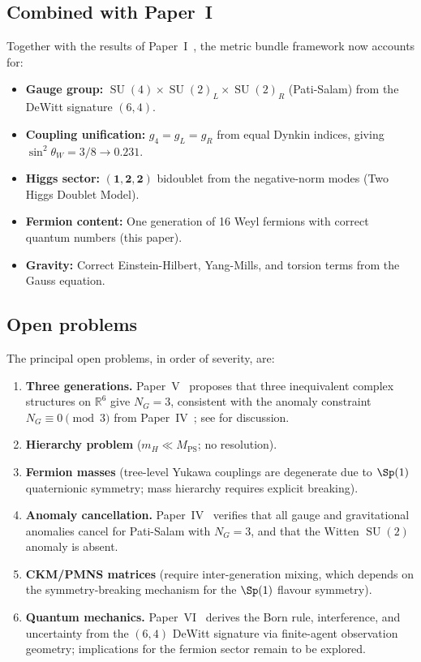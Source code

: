 \documentclass[12pt,a4paper]{article}
\theoremstyle{definition}
\newcommand{\SU}{\operatorname{SU}}
\newcommand{\R}{\mathbb{R}}
\begin{document}
\subsection{Combined with Paper~I}

Together with the results of Paper~I~\cite{Paper1}, the metric bundle framework now accounts for:
\begin{itemize}[nosep]
\item \textbf{Gauge group:} $\SU(4) \times \SU(2)_L \times \SU(2)_R$ (Pati-Salam) from the DeWitt signature $(6,4)$.
\item \textbf{Coupling unification:} $g_4 = g_L = g_R$ from equal Dynkin indices, giving $\sin^2\theta_W = 3/8 \to 0.231$.
\item \textbf{Higgs sector:} $(\mathbf{1}, \mathbf{2}, \mathbf{2})$ bidoublet from the negative-norm modes (Two Higgs Doublet Model).
\item \textbf{Fermion content:} One generation of 16 Weyl fermions with correct quantum numbers (this paper).
\item \textbf{Gravity:} Correct Einstein-Hilbert, Yang-Mills, and torsion terms from the Gauss equation.
\end{itemize}

\subsection{Open problems}

The principal open problems, in order of severity, are:
\begin{enumerate}
\item \textbf{Three generations.} Paper~V~\cite{Paper5} proposes that three inequivalent complex structures on $\R^6$ give $N_G = 3$, consistent with the anomaly constraint $N_G \equiv 0\pmod{3}$ from Paper~IV~\cite{Paper4}; see  for discussion.
\item \textbf{Hierarchy problem} ($m_H \ll M_{\mathrm{PS}}$; no resolution).
\item \textbf{Fermion masses} (tree-level Yukawa couplings are degenerate due to $\Sp(1)$ quaternionic symmetry; mass hierarchy requires explicit breaking).
\item \textbf{Anomaly cancellation.} Paper~IV~\cite{Paper4} verifies that all gauge and gravitational anomalies cancel for Pati-Salam with $N_G = 3$, and that the Witten $\SU(2)$ anomaly is absent.
\item \textbf{CKM/PMNS matrices} (require inter-generation mixing, which depends on the symmetry-breaking mechanism for the $\Sp(1)$ flavour symmetry).
\item \textbf{Quantum mechanics.} Paper~VI~\cite{Paper6} derives the Born rule, interference, and uncertainty from the $(6,4)$ DeWitt signature via finite-agent observation geometry; implications for the fermion sector remain to be explored.
\end{enumerate}
\end{document}

